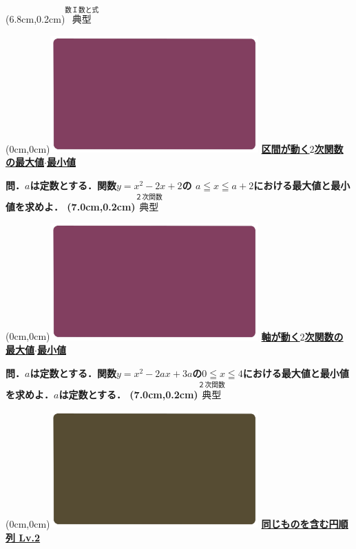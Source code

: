 \documentclass[10pt,
fleqn,
dvipdfmx,
uplatex
]{jsarticle}
\begin{document}
\at(6.8cm,0.2cm){\small\color{bradorange}$\overset{\text{数Ｉ数と式}}{\text{典型}}$}


\newpage



\at(0cm,0cm){\includegraphics[width=8cm,bb=0 0 1920 1080]{./youtube/thumbnails/templates/smart_background/２次関数.jpeg}}
{\color{orange}\bf\boldmath\large\underline{区間が動く$2$次関数の最大値$\cdot$最小値}}\vspace{0.3zw}

\LARGE 
\bf\boldmath 問．$a$は定数とする．関数$y=x^2-2x+2$の
$a\leqq x\leqq a+2$における最大値と最小値を求めよ．
\at(7.0cm,0.2cm){\small\color{bradorange}$\overset{\text{２次関数}}{\text{典型}}$}


\newpage



\at(0cm,0cm){\includegraphics[width=8cm,bb=0 0 1920 1080]{./youtube/thumbnails/templates/smart_background/２次関数.jpeg}}
{\color{orange}\bf\boldmath\Large\underline{軸が動く$2$次関数の最大値$\cdot$最小値}}\vspace{0.3zw}

\LARGE 
\bf\boldmath 問．$a$は定数とする．関数$y=x^2-2ax+3a$の$0\leqq x\leqq 4$における最大値と最小値を求めよ．$a$は定数とする．
\at(7.0cm,0.2cm){\small\color{bradorange}$\overset{\text{２次関数}}{\text{典型}}$}


\newpage



\at(0cm,0cm){\includegraphics[width=8cm,bb=0 0 1920 1080]{./youtube/thumbnails/templates/smart_background/場合の数.jpeg}}
{\color{orange}\bf\boldmath\Large\underline{同じものを含む円順列 Lv.2 }}\vspace{0.3zw}
\end{document}

